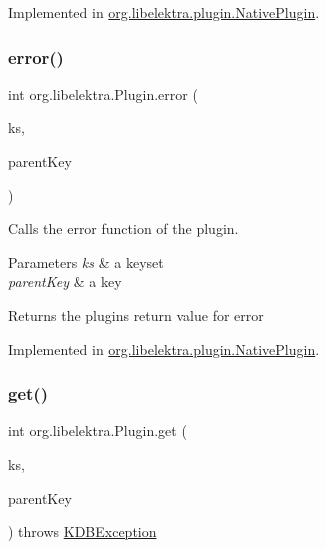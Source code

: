 Implemented in \mbox{\hyperlink{classorg_1_1libelektra_1_1plugin_1_1NativePlugin_acd6f4e0e81a11a1eba64dfa164c67a1f}{org.\+libelektra.\+plugin.\+Native\+Plugin}}.

\mbox{\label{interfaceorg_1_1libelektra_1_1Plugin_aa91370570c862ebe9eb83094a4731b9a}} 
\subsubsection{\texorpdfstring{error()}{error()}}
{\footnotesize\ttfamily int org.\+libelektra.\+Plugin.\+error (\begin{DoxyParamCaption}\item[{\mbox{\hyperlink{classorg_1_1libelektra_1_1KeySet}{Key\+Set}}}]{ks,  }\item[{\mbox{\hyperlink{classorg_1_1libelektra_1_1Key}{Key}}}]{parent\+Key }\end{DoxyParamCaption})}



Calls the error function of the plugin. 


\begin{DoxyParams}{Parameters}
{\em ks} & a keyset \\
\hline
{\em parent\+Key} & a key \\
\hline
\end{DoxyParams}
\begin{DoxyReturn}{Returns}
the plugin\textquotesingle{}s return value for error 
\end{DoxyReturn}


Implemented in \mbox{\hyperlink{classorg_1_1libelektra_1_1plugin_1_1NativePlugin_a54c2753b1d17e14be39526a6ff02e34d}{org.\+libelektra.\+plugin.\+Native\+Plugin}}.

\mbox{\label{interfaceorg_1_1libelektra_1_1Plugin_a9b8362549b7ab8ca5eff39cf6b7c8046}} 
\subsubsection{\texorpdfstring{get()}{get()}}
{\footnotesize\ttfamily int org.\+libelektra.\+Plugin.\+get (\begin{DoxyParamCaption}\item[{\mbox{\hyperlink{classorg_1_1libelektra_1_1KeySet}{Key\+Set}}}]{ks,  }\item[{\mbox{\hyperlink{classorg_1_1libelektra_1_1Key}{Key}}}]{parent\+Key }\end{DoxyParamCaption}) throws \mbox{\hyperlink{classorg_1_1libelektra_1_1exception_1_1KDBException}{K\+D\+B\+Exception}}}



